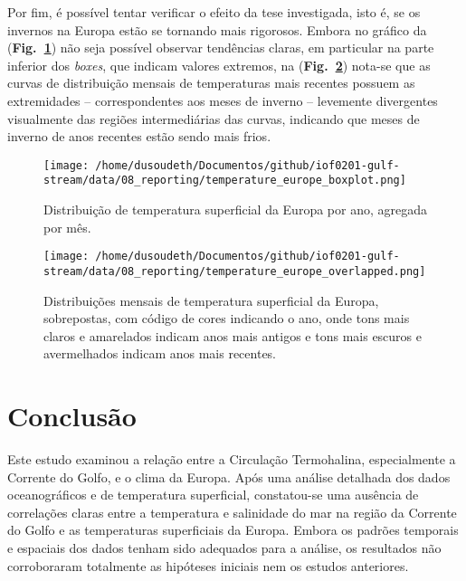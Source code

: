 \documentclass[journal]{IEEEtran}
\newcommand{\figref}[1]{(\textbf{Fig.~\ref{#1}})}
\begin{document}
            Por fim, é possível tentar verificar o efeito da tese investigada, isto é, se os invernos na Europa estão se tornando mais rigorosos. Embora no gráfico da \figref{fig:img_temperature_europe_boxplot} não seja possível observar tendências claras, em particular na parte inferior dos \emph{boxes}, que indicam valores extremos, na \figref{fig:img_temperature_europe_overlapped} nota-se que as curvas de distribuição mensais de temperaturas mais recentes possuem as extremidades -- correspondentes aos meses de inverno -- levemente divergentes visualmente das regiões intermediárias das curvas, indicando que meses de inverno de anos recentes estão sendo mais frios.
            \begin{figure}[ht]
                \centering
                \texttt{[image: /home/dusoudeth/Documentos/github/iof0201-gulf-stream/data/08\_reporting/temperature\_europe\_boxplot.png]}
                \caption{Distribuição de temperatura superficial da Europa por ano, agregada por mês.}
                \label{fig:img_temperature_europe_boxplot}
            \end{figure}
            \begin{figure}[ht]
                \centering
                \texttt{[image: /home/dusoudeth/Documentos/github/iof0201-gulf-stream/data/08\_reporting/temperature\_europe\_overlapped.png]}
                \caption{Distribuições mensais de temperatura superficial da Europa, sobrepostas, com código de cores indicando o ano, onde tons mais claros e amarelados indicam anos mais antigos e tons mais escuros e avermelhados indicam anos mais recentes.}
                \label{fig:img_temperature_europe_overlapped}
            \end{figure}
    
    \section{Conclusão}
        Este estudo examinou a relação entre a Circulação Termohalina, especialmente a Corrente do Golfo, e o clima da Europa. Após uma análise detalhada dos dados oceanográficos e de temperatura superficial, constatou-se uma ausência de correlações claras entre a temperatura e salinidade do mar na região da Corrente do Golfo e as temperaturas superficiais da Europa. Embora os padrões temporais e espaciais dos dados tenham sido adequados para a análise, os resultados não corroboraram totalmente as hipóteses iniciais nem os estudos anteriores. 
    

    \newpage

    
    
\end{document}
